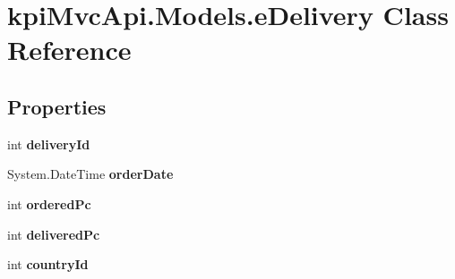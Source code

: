 \hypertarget{classkpi_mvc_api_1_1_models_1_1e_delivery}{}\section{kpi\+Mvc\+Api.\+Models.\+e\+Delivery Class Reference}
\label{classkpi_mvc_api_1_1_models_1_1e_delivery}
\subsection*{Properties}
\begin{DoxyCompactItemize}
\item 
\mbox{\label{classkpi_mvc_api_1_1_models_1_1e_delivery_a96902a8fe9cceb0bb2c36d8af461d989}} 
int {\bfseries delivery\+Id}
\item 
\mbox{\label{classkpi_mvc_api_1_1_models_1_1e_delivery_abb80a8a512ad34fb55bf08a1db0685cb}} 
System.\+Date\+Time {\bfseries order\+Date}
\item 
\mbox{\label{classkpi_mvc_api_1_1_models_1_1e_delivery_a9804110f4e7bb19508dfdabfa8e23332}} 
int {\bfseries ordered\+Pc}
\item 
\mbox{\label{classkpi_mvc_api_1_1_models_1_1e_delivery_a34de1afa042862ed4032c507f91f767e}} 
int {\bfseries delivered\+Pc}
\item 
\mbox{\label{classkpi_mvc_api_1_1_models_1_1e_delivery_ae29f78608820057bd198945920dd71e3}} 
int {\bfseries country\+Id}
\item 
\mbox{\label{classkpi_mvc_api_1_1_models_1_1e_delivery_ab0e02fd0ff3c0ed5c192da716619de39}} 

\end{DoxyCompactItemize}

